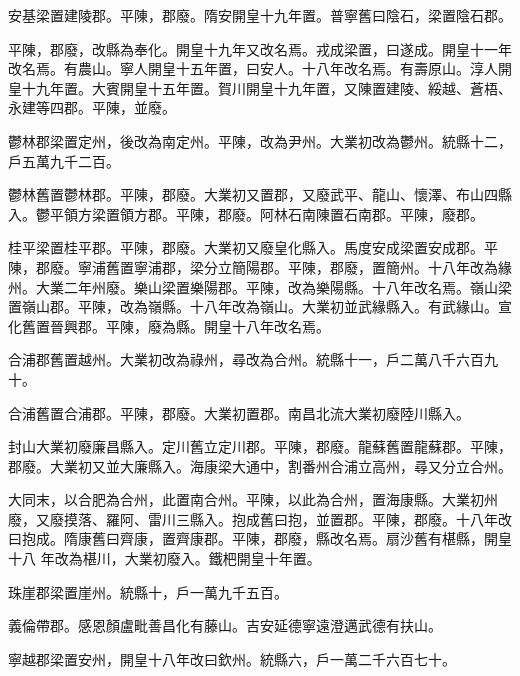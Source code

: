 \begin{pinyinscope}
 安基梁置建陵郡。平陳，郡廢。隋安開皇十九年置。普寧舊曰陰石，梁置陰石郡。



 平陳，郡廢，改縣為奉化。開皇十九年又改名焉。戎成梁置，曰遂成。開皇十一年改名焉。有農山。寧人開皇十五年置，曰安人。十八年改名焉。有壽原山。淳人開皇十九年置。大賓開皇十五年置。賀川開皇十九年置，又陳置建陵、綏越、蒼梧、永建等四郡。平陳，並廢。



 鬱林郡梁置定州，後改為南定州。平陳，改為尹州。大業初改為鬱州。統縣十二，戶五萬九千二百。



 鬱林舊置鬱林郡。平陳，郡廢。大業初又置郡，又廢武平、龍山、懷澤、布山四縣入。鬱平領方梁置領方郡。平陳，郡廢。阿林石南陳置石南郡。平陳，廢郡。



 桂平梁置桂平郡。平陳，郡廢。大業初又廢皇化縣入。馬度安成梁置安成郡。平陳，郡廢。寧浦舊置寧浦郡，梁分立簡陽郡。平陳，郡廢，置簡州。十八年改為緣州。大業二年州廢。樂山梁置樂陽郡。平陳，改為樂陽縣。十八年改名焉。嶺山梁置嶺山郡。平陳，改為嶺縣。十八年改為嶺山。大業初並武緣縣入。有武緣山。宣化舊置晉興郡。平陳，廢為縣。開皇十八年改名焉。



 合浦郡舊置越州。大業初改為祿州，尋改為合州。統縣十一，戶二萬八千六百九十。



 合浦舊置合浦郡。平陳，郡廢。大業初置郡。南昌北流大業初廢陸川縣入。



 封山大業初廢廉昌縣入。定川舊立定川郡。平陳，郡廢。龍蘇舊置龍蘇郡。平陳，郡廢。大業初又並大廉縣入。海康梁大通中，割番州合浦立高州，尋又分立合州。



 大同末，以合肥為合州，此置南合州。平陳，以此為合州，置海康縣。大業初州廢，又廢摸落、羅阿、雷川三縣入。抱成舊曰抱，並置郡。平陳，郡廢。十八年改曰抱成。隋康舊曰齊康，置齊康郡。平陳，郡廢，縣改名焉。扇沙舊有椹縣，開皇十八
 年改為椹川，大業初廢入。鐵杷開皇十年置。



 珠崖郡梁置崖州。統縣十，戶一萬九千五百。



 義倫帶郡。感恩顏盧毗善昌化有藤山。吉安延德寧遠澄邁武德有扶山。



 寧越郡梁置安州，開皇十八年改曰欽州。統縣六，戶一萬二千六百七十。




\end{pinyinscope}

